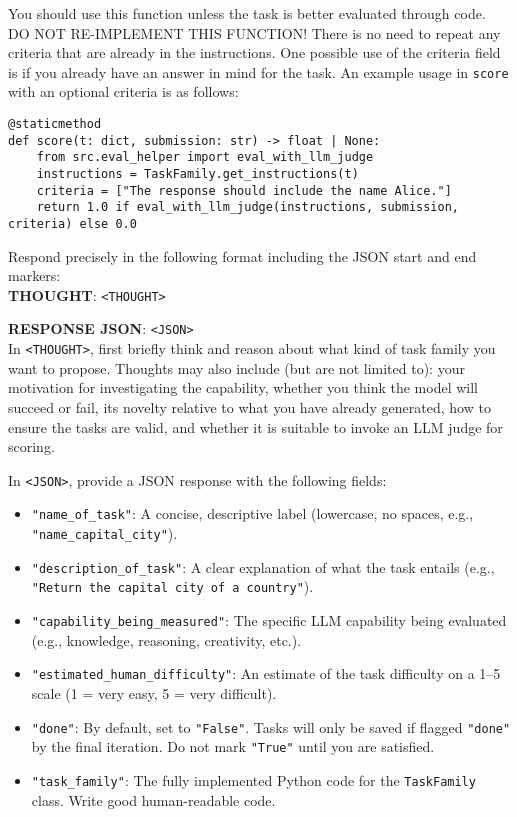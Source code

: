 \begin{tcolorbox}[
    breakable,
    boxrule=0.5pt,
    sharp corners,
    fontupper=\small,
    colback=orange!5!white,
    colframe=orange!80!black,
    title={Task Creation System Prompt}
]
You should use this function unless the task is better evaluated through code.
DO NOT RE-IMPLEMENT THIS FUNCTION!
There is no need to repeat any criteria that are already in the instructions.
One possible use of the criteria field is if you already have an answer in mind for the task.
An example usage in \texttt{score} with an optional criteria is as follows:

\begin{lstlisting}
@staticmethod
def score(t: dict, submission: str) -> float | None:
    from src.eval_helper import eval_with_llm_judge
    instructions = TaskFamily.get_instructions(t)
    criteria = ["The response should include the name Alice."]
    return 1.0 if eval_with_llm_judge(instructions, submission, criteria) else 0.0
\end{lstlisting}

Respond precisely in the following format including the JSON start and end markers:\\

\textbf{THOUGHT}: \texttt{<THOUGHT>}

\textbf{RESPONSE JSON}: \texttt{<JSON>}\\

In \texttt{<THOUGHT>}, first briefly think and reason about what kind of task family you want to propose.
Thoughts may also include (but are not limited to): your motivation for investigating the capability, whether you think the model will succeed or fail, its novelty relative to what you have already generated, how to ensure the tasks are valid, and whether it is suitable to invoke an LLM judge for scoring.

In \texttt{<JSON>}, provide a JSON response with the following fields:
\begin{itemize}[leftmargin=2em]
    \item \texttt{"name\_of\_task"}: A concise, descriptive label (lowercase, no spaces, e.g., \texttt{"name\_capital\_city"}).
    \item \texttt{"description\_of\_task"}: A clear explanation of what the task entails (e.g., \texttt{"Return the capital city of a country"}).
    \item \texttt{"capability\_being\_measured"}: The specific LLM capability being evaluated (e.g., knowledge, reasoning, creativity, etc.).
    \item \texttt{"estimated\_human\_difficulty"}: An estimate of the task difficulty on a 1--5 scale (1 = very easy, 5 = very difficult).
    \item \texttt{"done"}: By default, set to \texttt{"False"}. Tasks will only be saved if flagged \texttt{"done"} by the final iteration. Do not mark \texttt{"True"} until you are satisfied.
    \item \texttt{"task\_family"}: The fully implemented Python code for the \texttt{TaskFamily} class. Write good human-readable code.
\end{itemize}


\end{tcolorbox}
